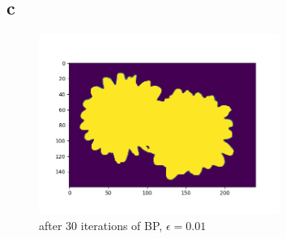 \documentclass[12pt]{article}
\begin{document}
\begin{section}{4.6}
	
	
	\subsection{c}
	\begin{figure}[H]
		\includegraphics[width=0.7\textwidth]{30iterepi0_01.png}
		\caption{after 30 iterations of BP, $\epsilon = 0.01$}
	\end{figure}

\end{section}
\end{document}
